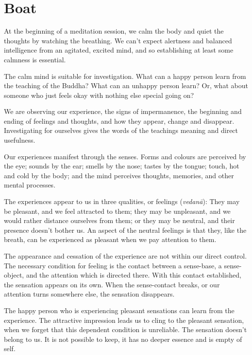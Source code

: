 \chapter{Boat}


At the beginning of a meditation session, we calm the body and quiet the
thoughts by watching the breathing. We can't expect alertness and
balanced intelligence from an agitated, excited mind, and so
establishing at least some calmness is essential.

The calm mind is suitable for investigation. What can a happy person
learn from the teaching of the Buddha? What can an unhappy person learn?
Or, what about someone who just feels okay with nothing else special
going on?

We are observing our experience, the signs of impermanence, the
beginning and ending of feelings and thoughts, and how they appear,
change and disappear. Investigating for ourselves gives the words of the
teachings meaning and direct usefulness.

Our experiences manifest through the senses. Forms and colours are
perceived by the eye; sounds by the ear; smells by the nose; tastes by
the tongue; touch, hot and cold by the body; and the mind perceives
thoughts, memories, and other mental processes.


The experiences appear to us in three qualities, or feelings
(\emph{vedanā}): They may be pleasant, and we feel attracted to them;
they may be unpleasant, and we would rather distance ourselves from
them; or they may be neutral, and their presence doesn't bother us. An
aspect of the neutral feelings is that they, like the breath, can be
experienced as pleasant when we pay attention to them.

The appearance and cessation of the experience are not within our direct
control. The necessary condition for feeling is the contact between a
sense-base, a sense-object, and the attention which is directed there.
With this contact established, the sensation appears on its own. When
the sense-contact breaks, or our attention turns somewhere else, the
sensation disappears.

The happy person who is experiencing pleasant sensations can learn from
the experience. The attractive impression leads us to cling to the
pleasant sensation, when we forget that this dependent condition is
unreliable. The sensation doesn't belong to us. It is not possible to
keep, it has no deeper essence and is empty of self.

